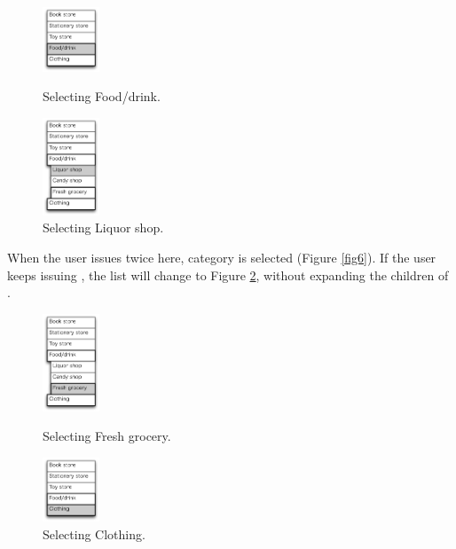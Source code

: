 \documentclass[conference]{IEEEtran}
\def\down{\tsf{▼}}
\begin{document}
\begin{figure}[H]
  \begin{minipage}{0.45\hsize}
    \centerline{\includegraphics[width=17mm,bb=0 0 139 157]{figures/fig4.pdf}}
    \caption{Selecting Food/drink.}
    \label{fig4}
  \end{minipage}
  \begin{minipage}{0.45\hsize}
    \centerline{\includegraphics[width=17mm,bb=0 0 139 238]{figures/fig5.pdf}}
    \caption{Selecting Liquor shop.}
    \label{fig5}
  \end{minipage}
\end{figure}

When the user issues {\down} twice here,
 category is selected (Figure \ref{fig6}).
%
If the user keeps issuing {\down}, 
the list will change to Figure \ref{fig8},
without expanding the children of .

\begin{figure}[H]
  \begin{minipage}{0.45\hsize}
    \centerline{\includegraphics[width=17mm,bb=0 0 139 238]{figures/fig6.pdf}}
    \caption{Selecting Fresh grocery.}
    \label{fig6}
  \end{minipage}
  \begin{minipage}{0.45\hsize}
    \centerline{\includegraphics[width=17mm,bb=0 0 139 157]{figures/fig8.pdf}}
    \caption{Selecting Clothing.}
    \label{fig8}
  \end{minipage}
\end{figure}
\end{document}

